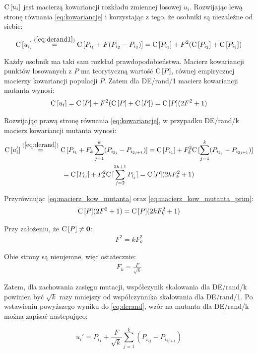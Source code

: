 \documentclass[a4paper,onecolumn,oneside,12pt,wide,floatssmall]{mwrep}
\def\C{{\rm C}\,}
\theoremstyle{definition}
\theoremstyle{plain}%
\theoremstyle{remark}
\begin{document}
$\C[u_i]$ jest macierzą kowariancji rozkładu zmiennej losowej $u_i$.
Rozwijając lewą stronę równania \eqref{eq:kowariancje} i korzystając z tego, że osobniki są niezależne od siebie:
\begin{align*}
\C[u_i] \overset{(\ref{eq:derand1})}{=} \C[P_{i_1} + F(P_{i_2} - P_{i_3})] = \C[P_{i_1}] + F^2(\C[P_{i_2}] + \C[P_{i_3}])
\end{align*}

Każdy osobnik ma taki sam rozkład prawdopodobieństwa. 
Macierz kowariancji punktów losowanych z $P$ ma teorytyczną wartość $\C[P]$,
równej empirycznej macierzy kowariancji populacji $P$.
Zatem dla DE/rand/1 macierz kowariancji mutanta wynosi:
\begin{equation} \label{eq:macierz_kow_mutanta}
\C[u_i] = \C[P] + F^2(\C[P] + \C[P]) = \C[P](2F^2 + 1)
\end{equation}

Rozwijając prawą stronę równania \eqref{eq:kowariancje}, w przypadku DE/rand/k macierz kowariancji mutanta wynosi:
\begin{multline} \label{eq:macierz_kow_mutanta_prim}
\C[u_i'] \overset{(\ref{eq:derand})}{=} \C[P_{i_1} + F_k\sum\limits_{j=1}^k (P_{i_{2j}} - P_{i_{2j+1}})] 
= \C[P_{i_1}] + F_k^2\C[\sum\limits_{j=1}^k (P_{i_{2j}} - P_{i_{2j+1}})] \\
= \C[P_{i_1}] + F_k^2\C[\sum\limits_{j=2}^{2k+1} P_{i_{j}}] = \C[P](2kF_k^2 + 1)
\end{multline}

Przyrównując \eqref{eq:macierz_kow_mutanta} oraz \eqref{eq:macierz_kow_mutanta_prim}:
\begin{align*}
\C[P](2F^2 + 1) = \C[P](2kF_k^2 + 1)
\end{align*}

Przy założeniu, że $\C[P] \neq \textbf{0}$:
\begin{align*}
F^2 = kF_k^2
\end{align*}

Obie strony są nieujemne, więc ostatecznie:
\begin{align*}
F_k = \frac{F}{\sqrt{k}}
\end{align*}

Zatem, dla zachowania zasięgu mutacji, współczynik skalowania dla DE/rand/k powinien być  
$\sqrt{k}$ razy mniejszy od współczynnika skalowania dla DE/rand/1. Po wstawieniu powyższego wyniku
do \eqref{eq:derand}, wzór na mutanta dla DE/rand/k można zapisać nastepująco:

$$ u_i' = P_{i_1} + \frac{F}{\sqrt{k}}\sum\limits_{j=1}^k (P_{i_{2j}} - P_{i_{2j+1}}) $$
\end{document}
